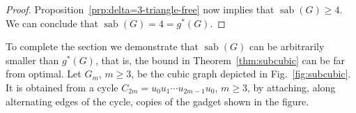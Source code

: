 \documentclass[10pt,a4paper]{amsart}
\DeclareMathOperator{\sab}{\mathrm{sab}}
\begin{document}
\begin{proof}
Proposition~\ref{prp:delta=3-triangle-free} now implies that $\sab(G) \ge 4$. We can conclude that $\sab(G) = 4 = g^\ast(G)$.

\end{proof}


To complete the section we demonstrate that $\sab(G)$ can be arbitrarily smaller than $g^\ast(G)$, that is, the bound in Theorem~\ref{thm:subcubic} can be far from optimal. Let $G_m$, $m \ge 3$, be the cubic graph depicted in Fig.~\ref{fig:subcubic}. It is obtained from a cycle $C_{2m}=u_0u_1\cdots u_{2m-1}u_0$, $m \ge 3$, by attaching, along alternating edges of the cycle, copies of the gadget shown in the figure. 
\end{document}
